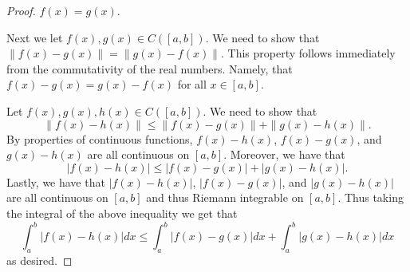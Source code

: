 \documentclass[12pt]{article}
\theoremstyle{definition}
\newcommand{\abs}[1]{\lvert #1 \rvert}
\begin{document}
\begin{enumerate}
\begin{proof}
                    $f(x)=g(x)$.\par\hspace{4mm} Next we let $f(x), g(x)\in
                    C([a, b])$. We need to show that
                    $\|f(x)-g(x)\|=\|g(x)-f(x)\|$. This property follows
                    immediately from the commutativity of the real numbers.
                    Namely, that $f(x)-g(x)=g(x)-f(x)$ for all $x\in[a,
                    b]$.\par\hspace{4mm} Let $f(x), g(x), h(x)\in C([a, b])$.
                    We need to show that 
                        \begin{equation*}
                            \|f(x)-h(x)\|\leq\|f(x)-g(x)\|+\|g(x)-h(x)\|.
                        \end{equation*}
                    By properties of continuous functions, $f(x)-h(x)$,
                    $f(x)-g(x)$, and $g(x)-h(x)$ are all continuous on $[a,
                    b]$. Moreover, we have that 
                        \begin{equation*}
                            \abs{f(x)-h(x)}\leq\abs{f(x)-g(x)}+\abs{g(x)-h(x)}.
                        \end{equation*}
                    Lastly, we have that $\abs{f(x)-h(x)}$, $\abs{f(x)-g(x)}$,
                    and $\abs{g(x)-h(x)}$ are all continuous on $[a, b]$ and
                    thus Riemann integrable on $[a, b]$. Thus taking the
                    integral of the above inequality we get that
                        \begin{equation*}
                            \int_{a}^{b}\abs{f(x)-h(x)}dx\leq\int_{a}^{b}\abs{f(x)-g(x)}dx+\int_{a}^{b}\abs{g(x)-h(x)}dx
                        \end{equation*}
                    as desired.
                \end{proof}
    \end{enumerate}
\end{document}
